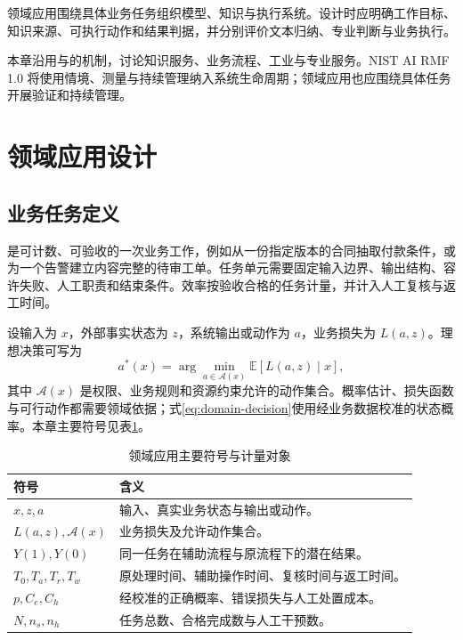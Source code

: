 \documentclass[../textbook.tex]{subfiles}
\begin{document}
\fi
{}

领域应用围绕具体业务任务组织模型、知识与执行系统。设计时应明确工作目标、知识来源、可执行动作和结果判据，并分别评价文本归纳、专业判断与业务执行。

本章沿用与的机制，讨论知识服务、业务流程、工业与专业服务。NIST AI RMF 1.0 将使用情境、测量与持续管理纳入系统生命周期\cite{nist2023airmf}；领域应用也应围绕具体任务开展验证和持续管理。

\section{领域应用设计}

\subsection{业务任务定义}
是可计数、可验收的一次业务工作，例如从一份指定版本的合同抽取付款条件，或为一个告警建立内容完整的待审工单。任务单元需要固定输入边界、输出结构、容许失败、人工职责和结束条件。效率按验收合格的任务计量，并计入人工复核与返工时间。

设输入为 $x$，外部事实状态为 $z$，系统输出或动作为 $a$，业务损失为 $L(a,z)$。理想决策可写为
\begin{equation}
 a^*(x)=\arg\min_{a\in\mathcal A(x)}\mathbb E[L(a,z)\mid x],
 \label{eq:domain-decision}
\end{equation}
其中 $\mathcal A(x)$ 是权限、业务规则和资源约束允许的动作集合。概率估计、损失函数与可行动作都需要领域依据；式\eqref{eq:domain-decision}使用经业务数据校准的状态概率。本章主要符号见表\ref{tab:domain-applications-symbols}。

\begin{table}[htbp]
\centering
\caption{领域应用主要符号与计量对象}
\label{tab:domain-applications-symbols}
\begin{tabular}{ll}
\toprule
符号 & 含义\\
\midrule
$x,z,a$ & 输入、真实业务状态与输出或动作。\\
$L(a,z),\mathcal A(x)$ & 业务损失及允许动作集合。\\
$Y(1),Y(0)$ & 同一任务在辅助流程与原流程下的潜在结果。\\
$T_0,T_a,T_r,T_w$ & 原处理时间、辅助操作时间、复核时间与返工时间。\\
$p,C_e,C_h$ & 经校准的正确概率、错误损失与人工处置成本。\\
$N,n_s,n_h$ & 任务总数、合格完成数与人工干预数。\\
\bottomrule
\end{tabular}
\end{table}
\end{document}
